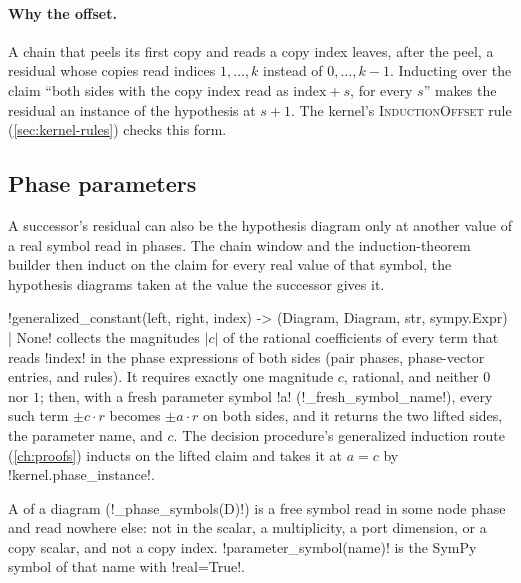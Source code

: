 \paragraph{Why the offset.} A chain that peels its first copy and reads a copy index leaves, after the peel, a residual whose copies read indices $1,\ldots,k$ instead of $0,\ldots,k-1$. Inducting over the claim ``both sides with the copy index read as $\text{index}+s$, for every $s$'' makes the residual an instance of the hypothesis at $s+1$. The kernel's \textsc{InductionOffset} rule (\cref{sec:kernel-rules}) checks this form.

\subsection{Phase parameters}\label{sec:kernel-parameters}

A successor's residual can also be the hypothesis diagram only at another value of a real symbol read in phases. The chain window and the induction-theorem builder then induct on the claim for every real value of that symbol, the hypothesis diagrams taken at the value the successor gives it.

\begin{definition}\label{def:kernel-generalized-constant}
\py!generalized_constant(left, right, index) -> (Diagram, Diagram, str, sympy.Expr) | None! collects the magnitudes $|c|$ of the rational coefficients of every term that reads \code!index! in the phase expressions of both sides (pair phases, phase-vector entries, and rules). It requires exactly one magnitude $c$, rational, and neither $0$ nor $1$; then, with a fresh parameter symbol \code!a! (\py!_fresh_symbol_name!), every such term $\pm c\cdot r$ becomes $\pm a\cdot r$ on both sides, and it returns the two lifted sides, the parameter name, and $c$. The decision procedure's generalized induction route (\cref{ch:proofs}) inducts on the lifted claim and takes it at $a=c$ by \py!kernel.phase_instance!.
\end{definition}

\begin{definition}\label{def:kernel-phase-parameter}
A  of a diagram (\py!_phase_symbols(D)!) is a free symbol read in some node phase and read nowhere else: not in the scalar, a multiplicity, a port dimension, or a copy scalar, and not a copy index. \py!parameter_symbol(name)! is the SymPy symbol of that name with \code!real=True!.
\end{definition}

